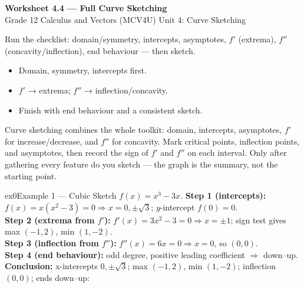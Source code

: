 \documentclass[11pt]{article}
\begin{document}
\begin{center}
{\LARGE\bfseries\color{titleblue}Worksheet 4.4 --- Full Curve Sketching}\\[2pt]
{\small Grade 12 Calculus and Vectors (MCV4U) \textperiodcentered{} Unit 4: Curve Sketching}
\end{center}

\begin{ideabox}
Run the checklist: domain/symmetry, intercepts, asymptotes, $f'$ (extrema), $f''$ (concavity/inflection), end behaviour — then sketch.
\begin{itemize}[leftmargin=*,itemsep=2pt]
  \item Domain, symmetry, intercepts first.
  \item $f'$ → extrema; $f''$ → inflection/concavity.
  \item Finish with end behaviour and a consistent sketch.
\end{itemize}
\end{ideabox}

\begin{learnbox}
Curve sketching combines the whole toolkit: domain, intercepts, asymptotes, $f'$ for increase/decrease, and $f''$ for concavity.
Mark critical points, inflection points, and asymptotes, then record the sign of $f'$ and $f''$ on each interval.
Only after gathering every feature do you sketch — the graph is the summary, not the starting point.
\end{learnbox}


\begin{example}{ex0}{Example 1 --- Cubic}
Sketch $f(x)=x^3-3x$.\soln
\textbf{Step 1 (intercepts):} $f(x)=x(x^2-3)=0\Rightarrow x=0,\pm\sqrt3$; $y$-intercept $f(0)=0$.\\[3pt]
\textbf{Step 2 (extrema from $f'$):} $f'(x)=3x^2-3=0\Rightarrow x=\pm1$; sign test gives max $(-1,2)$, min $(1,-2)$.\\[3pt]
\textbf{Step 3 (inflection from $f''$):} $f''(x)=6x=0\Rightarrow x=0$, so $(0,0)$.\\[3pt]
\textbf{Step 4 (end behaviour):} odd degree, positive leading coefficient $\Rightarrow$ down--up.\\[3pt]
\textbf{Conclusion:} x-intercepts $0,\pm\sqrt3$; max $(-1,2)$, min $(1,-2)$; inflection $(0,0)$; ends down--up:
\end{example}
\end{document}
